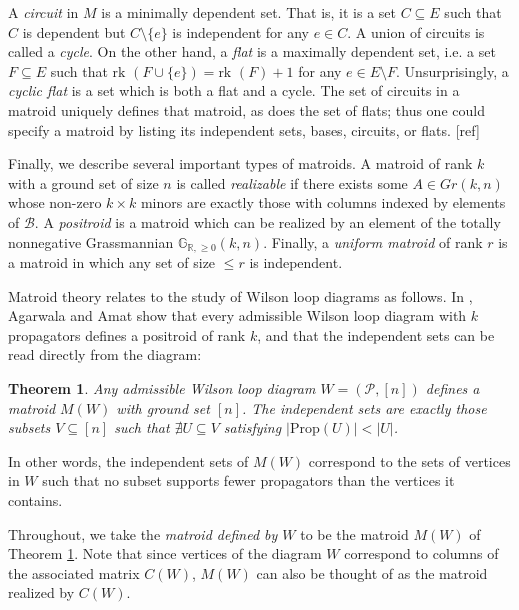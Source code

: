 \documentclass[11pt]{article}
\newcommand{\R}{\mathbb{R}}
\newcommand{\Gr}{\mathbb{G}_{\R, \geq 0}}
\newcommand{\rk}{\textrm{rk }}
\newcommand{\cP}{\mathcal{P}}
\newcommand{\cB}{\mathcal{B}}
\newcommand{\Prop}{\textrm{Prop}}
\newtheorem{thm}{Theorem}[section]
\theoremstyle{remark}
\theoremstyle{definition}
\begin{document}
A {\em circuit} in $M$ is a minimally dependent set. That is, it is a set $C \subseteq E$ such that $C$ is dependent but $C \setminus \{e\}$ is independent for any $e \in C$. A union of circuits is called a {\em cycle}. On the other hand, a {\em flat} is a maximally dependent set, i.e. a set $F \subseteq E$ such that $\rk(F \cup \{e\}) = \rk(F) + 1$ for any $e \in E \setminus F$. Unsurprisingly, a {\em cyclic flat} is a set which is both a flat and a cycle. The set of circuits in a matroid uniquely defines that matroid, as does the set of flats; thus one could specify a matroid by listing its independent sets, bases, circuits, or flats. [ref]

Finally, we describe several important types of matroids. A matroid of rank $k$ with a ground set of size $n$ is called {\em realizable} if there exists some $A \in Gr(k,n)$ whose non-zero $k\times k$ minors are exactly those with columns indexed by elements of $\cB$. A {\em positroid} is a matroid which can be realized by an element of the totally nonnegative Grassmannian $\Gr(k,n)$. Finally, a {\em uniform matroid} of rank $r$ is a matroid in which any set of size $\leq r$ is independent.


Matroid theory relates to the study of Wilson loop diagrams as follows. In \cite{wilsonloop}, Agarwala and Amat show that every admissible Wilson loop diagram with $k$ propagators defines a positroid of rank $k$, and that the independent sets can be read directly from the diagram:

\begin{thm} \label{thm WLD defines matroid} \cite[Theorem 3.6]{wilsonloop} Any admissible Wilson loop diagram $W =(\cP, [n])$ defines a matroid $M(W)$ with ground set $[n]$. The independent sets are exactly those subsets $V \subseteq [n]$ such that $\nexists U\subseteq V$ satisfying $|\Prop(U)| < |U|$. \label{thm:WLDmatroid}\end{thm}
In other words, the independent sets of $M(W)$ correspond to the sets of vertices in $W$ such that no subset supports fewer propagators than the vertices it contains.

Throughout, we take the {\em matroid defined by $W$} to be the matroid $M(W)$ of Theorem \ref{thm WLD defines matroid}. Note that since vertices of the diagram $W$ correspond to columns of the associated matrix $C(W)$, $M(W)$ can also be thought of as the matroid realized by $C(W)$. 


\end{document}

